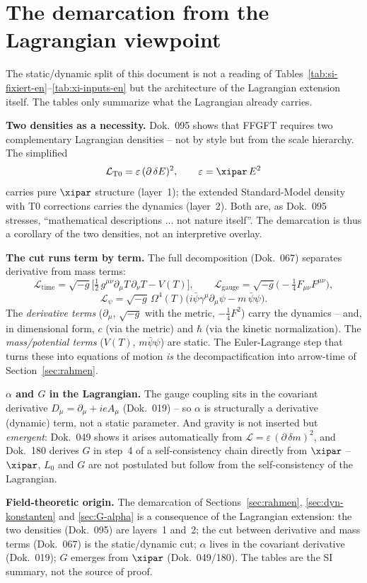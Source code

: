 \section{The demarcation from the Lagrangian viewpoint}

The static/dynamic split of this document is not a reading of
Tables~\ref{tab:si-fixiert-en}--\ref{tab:xi-inputs-en} but the architecture of the
Lagrangian extension itself. The tables only summarize what the Lagrangian already
carries.

\textbf{Two densities as a necessity.} Dok.~095 shows that FFGFT requires two
complementary Lagrangian densities -- not by style but from the scale hierarchy.
The simplified
\[
  \mathcal{L}_{\mathrm{T0}} = \varepsilon\,(\partial\,\delta E)^2,
  \qquad \varepsilon = \xipar\,E^2
\]
carries pure $\xipar$ structure (layer~1); the extended Standard-Model density with
T0 corrections carries the dynamics (layer~2). Both are, as Dok.~095 stresses,
``mathematical descriptions ... not nature itself''. The demarcation is thus a
corollary of the two densities, not an interpretive overlay.

\textbf{The cut runs term by term.} The full decomposition (Dok.~067) separates
derivative from mass terms:
\[
  \mathcal{L}_{\text{time}} = \sqrt{-g}\Big[\tfrac{1}{2}\,g^{\mu\nu}\partial_\mu T\,\partial_\nu T - V(T)\Big],
  \qquad
  \mathcal{L}_{\text{gauge}} = \sqrt{-g}\big(-\tfrac{1}{4}F_{\mu\nu}F^{\mu\nu}\big),
\]
\[
  \mathcal{L}_\psi = \sqrt{-g}\,\Omega^4(T)\big(i\bar\psi\gamma^\mu\partial_\mu\psi - m\,\bar\psi\psi\big).
\]
The \emph{derivative terms} ($\partial_\mu$, $\sqrt{-g}$ with the metric,
$-\tfrac14 F^2$) carry the dynamics -- and, in dimensional form, $c$ (via the
metric) and $\hbar$ (via the kinetic normalization). The \emph{mass/potential
terms} ($V(T)$, $m\bar\psi\psi$) are static. The Euler-Lagrange step that turns
these into equations of motion \emph{is} the decompactification into arrow-time of
Section~\ref{sec:rahmen}.

\textbf{$\alpha$ and $G$ in the Lagrangian.} The gauge coupling sits in the
covariant derivative $D_\mu = \partial_\mu + ieA_\mu$ (Dok.~019) -- so $\alpha$ is
structurally a derivative (dynamic) term, not a static parameter. And gravity is
not inserted but \emph{emergent}: Dok.~049 shows it arises automatically from
$\mathcal{L} = \varepsilon\,(\partial\,\delta m)^2$, and Dok.~180 derives $G$ in
step~4 of a self-consistency chain directly from $\xipar$ -- $\xipar$, $L_0$ and
$G$ are not postulated but follow from the self-consistency of the Lagrangian.

\begin{result}
\textbf{Field-theoretic origin.} The demarcation of
Sections~\ref{sec:rahmen}, \ref{sec:dyn-konstanten} and \ref{sec:G-alpha} is a
consequence of the Lagrangian extension: the two densities (Dok.~095) are layers~1
and~2; the cut between derivative and mass terms (Dok.~067) is the static/dynamic
cut; $\alpha$ lives in the covariant derivative (Dok.~019); $G$ emerges from
$\xipar$ (Dok.~049/180). The tables are the SI summary, not the source of proof.
\end{result}
